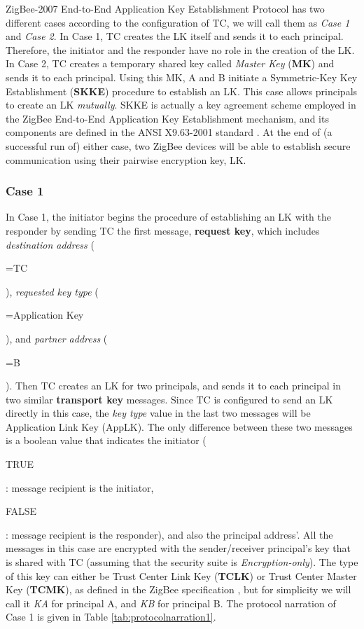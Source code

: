 ZigBee-2007 End-to-End Application Key Establishment Protocol has two different cases according to the configuration of TC, we will call them as \emph{Case 1} and \emph{Case 2}. 
In Case 1, TC creates the LK itself and sends it to each principal. 
Therefore, the initiator and the responder have no role in the creation of the LK. 
In Case 2, TC creates a temporary shared key called \emph{Master Key} (\textbf{MK}) and sends it to each principal.
Using this MK, A and B initiate a Symmetric-Key Key Establishment (\textbf{SKKE}) procedure to establish an LK. 
This case allows principals to create an LK \emph{mutually}. 
SKKE is actually a key agreement scheme employed in the ZigBee End-to-End Application Key Establishment mechanism, and its components are defined in the ANSI X9.63-2001 standard \cite{ansi:x963}.
At the end of (a successful run of) either case, two ZigBee devices will be able to establish secure communication using their pairwise encryption key, LK.

\subsubsection{Case 1}

In Case 1, the initiator begins the procedure of establishing an LK with the responder by sending TC the first message, \textbf{request key},
which includes \emph{destination address} (\begin{footnotesize}=TC\end{footnotesize}), \emph{requested key type} (\begin{footnotesize}=Application Key\end{footnotesize}), and \emph{partner address} (\begin{footnotesize}=B\end{footnotesize}). 
Then TC creates an LK for two principals, and sends it to each principal in two similar \textbf{transport key} messages. 
Since TC is configured to send an LK directly in this case, the \emph{key type} value in the last two messages will be Application Link Key (AppLK). 
The only difference between these two messages is a boolean value that indicates the initiator 
(\begin{footnotesize}TRUE\end{footnotesize}: message recipient is the initiator, \begin{footnotesize}FALSE\end{footnotesize}: message recipient is the responder), and also the principal address'. 
All the messages in this case are encrypted with the sender/receiver principal's key that is shared with TC (assuming that the security suite is \emph{Encryption-only}). 
The type of this key can either be Trust Center Link Key (\textbf{TCLK}) or Trust Center Master Key (\textbf{TCMK}), as defined in the ZigBee specification \cite{ZigBee:2007}, 
but for simplicity we will call it \emph{KA} for principal A, and \emph{KB} for principal B.
The protocol narration of Case 1 is given in Table \ref{tab:protocolnarration1}.

